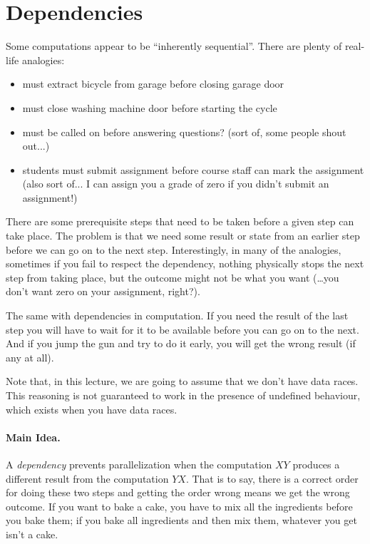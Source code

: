 




\section*{Dependencies}
Some computations appear to be ``inherently sequential''. There are plenty of real-life analogies:

\begin{itemize}
\item must extract bicycle from garage before closing garage door
 
\item must close washing machine door before starting the cycle
 
\item must be called on before answering questions? (sort of, some people shout out...)
 
\item students must submit assignment before course staff can mark the assignment (also sort of... I can assign you a grade of zero if you didn't submit an assignment!)
\end{itemize}

There are some prerequisite steps that need to be taken before a given step can take place. The problem is that we need some result or state from an earlier step before we can go on to the next step. Interestingly, in many of the analogies, sometimes if you fail to respect the dependency, nothing physically stops the next step from taking place, but the outcome might not be what you want (\ldots you don't want zero on your assignment, right?).

The same with dependencies in computation. If you need the result of the last step you will have to wait for it to be available before you can go on to the next. And if you jump the gun and try to do it early, you will get the wrong result (if any at all). 

Note that, in this lecture, we are going to assume that we don't have data races. This reasoning is not guaranteed to work in the presence of undefined behaviour, which exists when you have data races.

\paragraph{Main Idea.} A \emph{dependency} prevents parallelization
when the computation $XY$ produces a different result from the
computation $YX$. That is to say, there is a correct order for doing these two steps and getting the order wrong means we get the wrong outcome. If you want to bake a cake, you have to mix all the ingredients before you bake them; if you bake all ingredients and then mix them, whatever you get isn't a cake.

